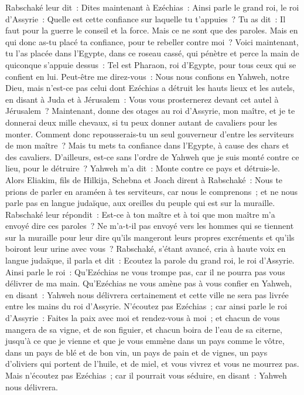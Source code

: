 \begin{multicols}{2}
Rabschaké leur dit~: Dites maintenant à Ezéchias~: Ainsi parle le grand roi, le roi d'Assyrie~: Quelle est cette confiance sur laquelle tu t'appuies~?
Tu as dit~: Il faut pour la guerre le conseil et la force. Mais ce ne sont que des paroles. Mais en qui donc as-tu placé ta confiance, pour te rebeller contre moi~?
Voici maintenant, tu l'as placée dans l'Egypte, dans ce roseau cassé, qui pénètre et perce la main de quiconque s'appuie dessus~: Tel est Pharaon, roi d'Egypte, pour tous ceux qui se confient en lui.
Peut-être me direz-vous~: Nous nous confions en Yahweh, notre Dieu, mais n'est-ce pas celui dont Ezéchias a détruit les hauts lieux et les autels, en disant à Juda et à Jérusalem~: Vous vous prosternerez devant cet autel à Jérusalem~?
Maintenant, donne des otages au roi d'Assyrie, mon maître, et je te donnerai deux mille chevaux, si tu peux donner autant de cavaliers pour les monter.
Comment donc repousserais-tu un seul gouverneur d'entre les serviteurs de mon maître~? Mais tu mets ta confiance dans l'Egypte, à cause des chars et des cavaliers.
D'ailleurs, est-ce sans l'ordre de Yahweh que je suis monté contre ce lieu, pour le détruire~? Yahweh m'a dit~: Monte contre ce pays et détruis-le.
Alors Eliakim, fils de Hilkija, Schebna et Joach dirent à Rabschaké~: Nous te prions de parler en araméen à tes serviteurs, car nous le comprenons~; et ne nous parle pas en langue judaïque, aux oreilles du peuple qui est sur la muraille.
Rabschaké leur répondit~: Est-ce à ton maître et à toi que mon maître m'a envoyé dire ces paroles~? Ne m'a-t-il pas envoyé vers les hommes qui se tiennent sur la muraille pour leur dire qu'ils mangeront leurs propres excréments et qu'ils boiront leur urine avec vous~?
Rabschaké, s'étant avancé, cria à haute voix en langue judaïque, il parla et dit~: Ecoutez la parole du grand roi, le roi d'Assyrie.
Ainsi parle le roi~: Qu'Ezéchias ne vous trompe pas, car il ne pourra pas vous délivrer de ma main.
Qu'Ezéchias ne vous amène pas à vous confier en Yahweh, en disant~: Yahweh nous délivrera certainement et cette ville ne sera pas livrée entre les mains du roi d'Assyrie.
N'écoutez pas Ezéchias~; car ainsi parle le roi d'Assyrie~: Faites la paix avec moi et rendez-vous à moi~; et chacun de vous mangera de sa vigne, et de son figuier, et chacun boira de l'eau de sa citerne,
jusqu'à ce que je vienne et que je vous emmène dans un pays comme le vôtre, dans un pays de blé et de bon vin, un pays de pain et de vignes, un pays d'oliviers qui portent de l'huile, et de miel, et vous vivrez et vous ne mourrez pas. Mais n'écoutez pas Ezéchias~; car il pourrait vous séduire, en disant~: Yahweh nous délivrera.

\end{multicols}
